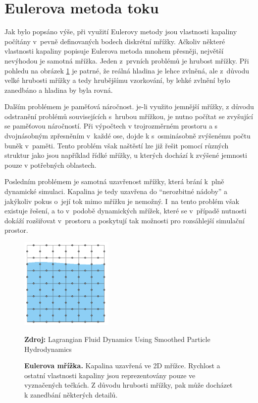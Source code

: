 \section{Eulerova metoda toku}
Jak bylo popsáno výše, při využití Eulerovy metody jsou vlastnosti kapaliny počítány v~pevně definovaných bodech diskrétní mřížky. Ačkoliv některé vlastnosti kapaliny popisuje Eulerova metoda mnohem přesněji, největší nevýhodou je samotná mřížka. Jeden z~prvních problémů je hrubost mřížky. Při pohledu na obrázek \ref{fig:EulerGrid} je patrné, že reálná hladina je lehce zvlněná, ale z~důvodu velké hrubosti mřížky a tedy hrubějšímu vzorkování, by lehké zvlnění bylo zanedbáno a hladina by byla rovná.

Dalším problémem je paměťová náročnost. je-li využito jemnější mřížky, z důvodu odstranění problémů souvisejících s~hrubou mřížkou, je nutno počítat se zvyšující se paměťovou náročností. Při výpočtech v trojrozměrném prostoru a s dvojnásobným zpřesněním v~každé ose, dojde k s~osminásobně zvýšenému počtu buněk v~paměti. Tento problém však naštěstí lze již řešit pomocí různých struktur jako jsou například řídké mřížky, u kterých dochází k zvýšené jemnosti pouze v potřebných oblastech.

Posledním problémem je samotná uzavřenost mřížky, která brání k~plně dynamické simulaci. Kapalina je tedy uzavřena do \enquote{nerozbitné nádoby} a jakýkoliv pokus o~její tok mimo mřížku je nemožný. I~na tento problém však existuje řešení, a to v~podobě dynamických mřížek, které se v~případě nutnosti dokáží rozšiřovat v~prostoru a poskytují tak možnosti pro rozsáhlejší simulační prostor.
\cite{KelagerSPH}

\begin{figure}[hbt]
	\centering
	\captionsetup{justification=centering}
	\includegraphics[width=0.4\textwidth]{obrazky-figures/GridEuler.PNG}
	\caption{\textbf{Eulerova mřížka.} Kapalina uzavřená ve 2D mřížce. Rychlost a ostatní vlastnosti kapaliny jsou reprezentovány pouze ve vyznačených tečkách. Z důvodu hrubosti mřížky, pak může docházet k zanedbání některých detailů.}
	\textbf{Zdroj: } Lagrangian Fluid Dynamics Using Smoothed Particle Hydrodynamics \cite{KelagerSPH}
	\label{fig:EulerGrid}
\end{figure}

